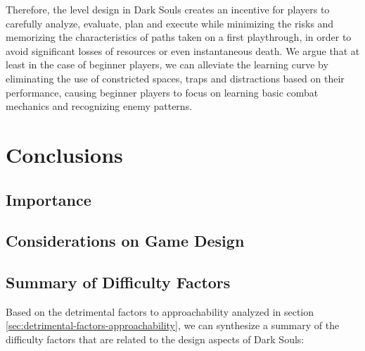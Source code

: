 Therefore, the level design in Dark Souls creates an incentive for players to carefully analyze, evaluate, plan and execute while minimizing the risks and memorizing the characteristics of paths taken on a first playthrough, in order to avoid significant losses of resources or even instantaneous death. We argue that at least in the case of beginner players, we can alleviate the learning curve by eliminating the use of constricted spaces, traps and distractions based on their performance, causing beginner players to focus on learning basic combat mechanics and recognizing enemy patterns.

\section{Conclusions}

\subsection{Importance}

\subsection{Considerations on Game Design}




\subsection{Summary of Difficulty Factors}


Based on the detrimental factors to approachability analyzed in section \ref{sec:detrimental-factors-approachability}, we can synthesize a summary of the difficulty factors that are related to the design aspects of Dark Souls:

